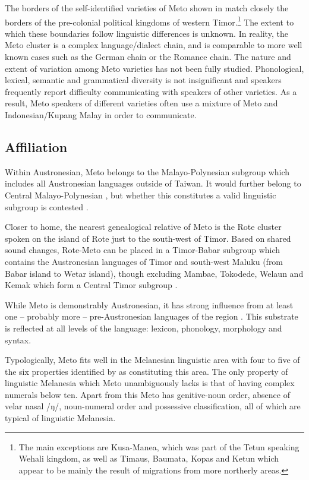 The borders of the self-identified varieties of Meto shown in 
match closely the borders of the pre-colonial political kingdoms of western Timor.\footnote{
		The main exceptions are Kusa-Manea, which was
		part of the Tetun speaking Wehali kingdom,
		as well as Timaus, Baumata, Kopas and Ketun which
		appear to be mainly the result of migrations from more northerly areas.}
The extent to which these boundaries follow linguistic differences is unknown.
In reality, the Meto cluster is a complex language/dialect chain,
and is comparable to more well known cases such as the German chain or the Romance chain.
The nature and extent of variation among Meto varieties has not been fully studied.
Phonological, lexical, semantic and grammatical diversity is not insignificant
and speakers frequently report difficulty communicating with speakers of other varieties.
As a result, Meto speakers of different varieties often
use a mixture of Meto and Indonesian/Kupang Malay in order to communicate.

\subsection{Affiliation}
Within Austronesian, Meto belongs to the Malayo-Polynesian subgroup
which includes all Austronesian languages outside of Taiwan.
It would further belong to Central Malayo-Polynesian
\citep{bl81,bl93,bl09b}, but whether this constitutes a valid
linguistic subgroup is contested \citep{ro95,ad05,dogr08}.

Closer to home, the nearest genealogical relative of Meto is the Rote cluster
spoken on the island of Rote just to the south-west of Timor.
Based on shared sound changes, Rote-Meto can be placed in a Timor-Babar
subgroup which contains the Austronesian languages of Timor and south-west Maluku
(from Babar island to Wetar island), though excluding
Mambae, Tokodede, Welaun and Kemak which form a Central Timor subgroup \cite{ed18d,ed19}.

While Meto is demonstrably Austronesian,
it has strong influence from at least one -- probably more --
pre-Austronesian languages of the region \citep{ed16c,ed18b}.
This substrate is reflected at all levels of the language:
lexicon, phonology, morphology and syntax.

Typologically, Meto fits well in the Melanesian linguistic area with four to five
of the six properties identified by \cite{sc15} as constituting this area.
The only property of linguistic Melanesia which Meto unambiguously lacks
is that of having complex numerals below ten.
Apart from this Meto has genitive-noun order,
absence of velar nasal /ŋ/, noun-numeral order
and possessive classification,
all of which are typical of linguistic Melanesia.

